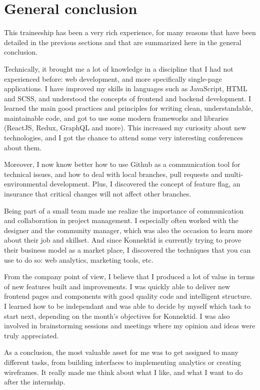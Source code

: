 \section{General conclusion}
\label{sec:conclusion}

This traineeship has been a very rich experience, for many reasons that have been detailed in the previous sections and that are summarized here in the general conclusion.

Technically, it brought me a lot of knowledge in a discipline that I had not experienced before: web development, and more specifically single-page applications. I have improved my skills in languages such as JavaScript, HTML and SCSS, and understood the concepts of frontend and backend development. I learned the main good practices and principles for writing clean, understandable, maintainable code, and got to use some modern frameworks and libraries (ReactJS, Redux, GraphQL and more). This increased my curiosity about new technologies, and I got the chance to attend some very interesting conferences about them. 

Moreover, I now know better how to use Github as a communication tool for technical issues, and how to deal with local branches, pull requests and multi-environmental development. Plus, I discovered the concept of feature flag, an insurance that critical changes will not affect other branches.

Being part of a small team made me realize the importance of communication and collaboration in project management. I especially often worked with the designer and the community manager, which was also the occasion to learn more about their job and skillset. And since Konnektid is currently trying to prove their business model as a market place, I discovered the techniques that you can use to do so: web analytics, marketing tools, etc.

From the company point of view, I believe that I produced a lot of value in terms of new features built and improvements. I was quickly able to deliver new frontend pages and components with good quality code and intelligent structure. I learned how to be independant and was able to decide by myself which task to start next, depending on the month's objectives for Konnektid. I was also involved in brainstorming sessions and meetings where my opinion and ideas were truly appreciated.

As a conclusion, the most valuable asset for me was to get assigned to many different tasks, from building interfaces to implementing analytics or creating wireframes. It really made me think about what I like, and what I want to do after the internship.